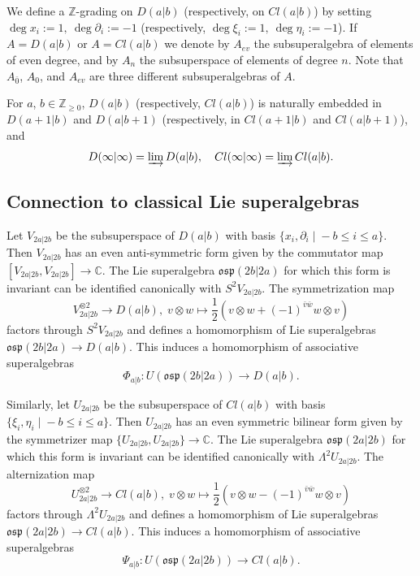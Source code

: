 \documentclass[12pt]{amsart}
\theoremstyle{plain} %
\numberwithin{equation}{section}
\theoremstyle{definition}
\theoremstyle{remark}
\theoremstyle{plain} %
\newcommand{\osp}{\mathfrak{osp}}
\begin{document}
We define a $\mathbb Z$-grading on $D(a|b)$ (respectively, on $Cl(a|b)$) by setting $\operatorname{deg} x_i:=1,\ \operatorname{deg} \partial_i:=-1$ (respectively, $\operatorname{deg} \xi_i:=1,\ \operatorname{deg} \eta_i:=-1$).
If $A=D(a|b)$ or $A=Cl(a|b)$ we denote by $A_{ev}$ the subsuperalgebra of elements of even degree, and by $A_n$ the subsuperspace of elements of degree $n$. Note that $A_{\bar{0}}$, $A_{0}$, and $A_{ev}$ are three different subsuperalgebras of $A$.


For $a$, $b\in\mathbb{Z}_{\geq 0}$, $D(a|b)$ (respectively, $Cl(a|b)$)  is naturally embedded in $D(a+1|b)$ and $D(a|b+1)$ (respectively, in $Cl(a+1|b)$ and $Cl(a|b+1)$), and 
$$D(\infty|\infty)=\varinjlim D(a|b),\quad Cl(\infty|\infty)=\varinjlim Cl(a|b).$$


\subsection{Connection to classical Lie superalgebras} \label{sebsec-conn}
Let $V_{2a|2b}$ be the subsuperspace of $D(a|b)$ with basis $\{x_i,\partial_i \; | \; -b \leq i \leq  a \}$. Then $V_{2a|2b}$ has an even anti-symmetric form given by the commutator map $[V_{2a|2b},V_{2a|2b}]\to\mathbb C$. The Lie superalgebra
$\osp(2b|2a)$ %
for which this form is invariant can be identified canonically with $S^2 V_{2a|2b} $. The symmetrization map 
$$
V_{2a|2b}^{\otimes 2} \to D(a|b), \; v\otimes w \mapsto \frac{1}{2} \left( v\otimes w  + (-1)^{\bar{v}\bar{w}} w \otimes v\right)
$$ 
factors through  $S^2 V_{2a|2b}$  and  defines a homomorphism of Lie superalgebras \\
$\osp(2b|2a) \to D(a|b).$ This   
induces a homomorphism of associative superalgebras $$\Phi_{a|b}:U(\osp(2b|2a))\to D(a|b).$$

Similarly, let $U_{2a|2b}$ be the subsuperspace of $Cl(a|b)$ with basis $\{\xi_i,\eta_i \; | \; -b \leq i \leq  a \}$. Then $U_{2a|2b}$ has an even  symmetric bilinear form given by the symmetrizer map $\{U_{2a|2b},U_{2a|2b}\}\to\mathbb C$. The Lie superalgebra
$\osp(2a|2b)$ %
for which this form is invariant can be identified canonically with $\Lambda^2 U_{2a|2b} $. The  alternization map 
$$
U_{2a|2b}^{\otimes 2} \to Cl(a|b), \; v\otimes w \mapsto \frac{1}{2} \left( v\otimes w  - (-1)^{\bar{v}\bar{w}} w \otimes v\right)
$$  
factors through  $\Lambda^2 U_{2a|2b} $  and  defines a homomorphism of Lie superalgebras\\ $\osp(2a|2b)\to Cl(a|b)$. This  
induces a homomorphism of associative superalgebras $$\Psi_{a|b}:U(\osp(2a|2b))\to Cl(a|b).$$
\end{document}
